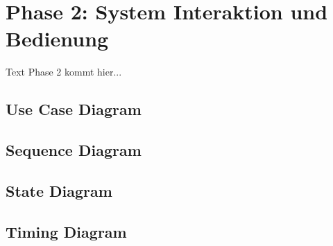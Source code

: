 \chapter{Phase 2: System Interaktion und Bedienung}

Text Phase 2 kommt hier...

\section{Use Case Diagram}

\section{Sequence Diagram}

\section{State Diagram}

\section{Timing Diagram}

